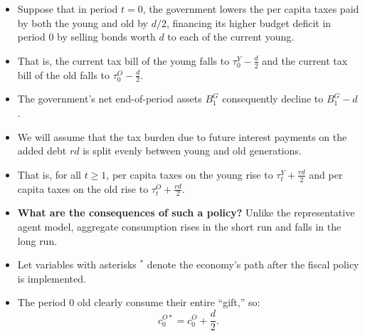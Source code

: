 \documentclass[12pt]{article}
\begin{document}
\begin{itemize}
  \item Suppose that in period $t = 0$, the government lowers the per capita taxes paid by both the young and old by $d/2$, financing its higher budget deficit in period 0 by selling bonds worth $d$ to each of the current young.
  
  \item That is, the current tax bill of the young falls to $\tau_0^Y - \frac{d}{2}$ and the current tax bill of the old falls to $\tau_0^O - \frac{d}{2}$.
  
  \item The government’s net end-of-period assets $B_1^G$ consequently decline to $B_1^G - d$.
  
  \item We will assume that the tax burden due to future interest payments on the added debt $rd$ is split evenly between young and old generations.
  
  \item That is, for all $t \geq 1$, per capita taxes on the young rise to $\tau_t^Y + \frac{rd}{2}$ and per capita taxes on the old rise to $\tau_t^O + \frac{rd}{2}$.
  
  \item \textbf{What are the consequences of such a policy?} Unlike the representative agent model, aggregate consumption rises in the short run and falls in the long run.
  
  \item Let variables with asterisks $^*$ denote the economy’s path after the fiscal policy is implemented.
  
  \item The period 0 old clearly consume their entire “gift,” so:
  \[
  c_0^{O*} = c_0^O + \frac{d}{2}. \tag{25}
  \]
\end{itemize}
\end{document}
